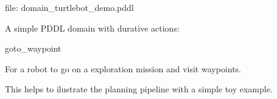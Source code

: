file\+: {\ttfamily domain\+\_\+turtlebot\+\_\+demo.\+pddl}

A simple P\+D\+DL domain with durative actions\+:

goto\+\_\+waypoint

For a robot to go on a exploration mission and visit waypoints.

This helps to ilustrate the planning pipeline with a simple toy example. 